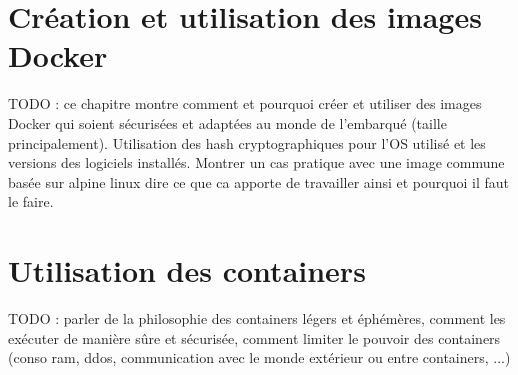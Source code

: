\documentclass[11pt,a4paper,oneside]{report}
\begin{document}
\chapter{Création et utilisation des images Docker}\label{creation_utilisation_images_docker}
TODO : ce chapitre montre comment et pourquoi créer et utiliser des images Docker qui soient sécurisées et adaptées au monde de l'embarqué (taille principalement). Utilisation des hash cryptographiques pour l'OS utilisé et les versions des logiciels installés. 
Montrer un cas pratique avec une image commune basée sur alpine linux dire ce que ca apporte de travailler ainsi et pourquoi il faut le faire.


\chapter{Utilisation des containers}\label{utilisation_containers}
TODO : parler de la philosophie des containers légers et éphémères, comment les exécuter de manière sûre et sécurisée, comment limiter le pouvoir des containers (conso ram, ddos, communication avec le monde extérieur ou entre containers, ...)
\end{document}
